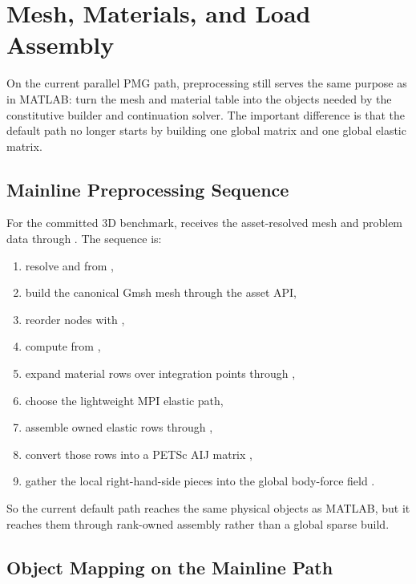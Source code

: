 \chapter{Mesh, Materials, and Load Assembly}

On the current parallel PMG path, preprocessing still serves the same purpose
as in MATLAB: turn the mesh and material table into the objects needed by the
constitutive builder and continuation solver. The important difference is that
the default path no longer starts by building one global  matrix and
one global elastic matrix.

\section{Mainline Preprocessing Sequence}

For the committed 3D benchmark, 
receives the asset-resolved mesh and problem data through
. The sequence is:
\begin{enumerate}
\item resolve  and 
from ,
\item build the canonical Gmsh mesh through the asset API,
\item reorder nodes with ,
\item compute  from ,
\item expand material rows over integration points through
,
\item choose the lightweight MPI elastic path,
\item assemble owned elastic rows through
,
\item convert those rows into a PETSc AIJ matrix ,
\item gather the local right-hand-side pieces into the global body-force field
.
\end{enumerate}

So the current default path reaches the same physical objects as MATLAB, but it
reaches them through rank-owned assembly rather than a global sparse build.

\section{Object Mapping on the Mainline Path}

